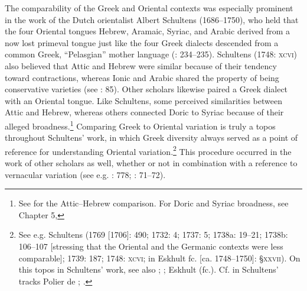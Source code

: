 The comparability of the Greek and Oriental contexts was especially prominent in the work of the Dutch orientalist Albert Schultens (1686–1750), who held that the four Oriental tongues Hebrew, Aramaic, Syriac, and Arabic derived from a now lost primeval tongue just like the four Greek dialects descended from a common Greek, “Pelasgian” mother language (\citealt{Schultens1739}: 234–235). Schultens (1748: \textsc{xcvi)} also believed that Attic and Hebrew were similar because of their tendency toward contractions, whereas Ionic and Arabic shared the property of being conservative varieties (see \citealt{Eskhult2015}: 85). Other scholars likewise paired a Greek dialect with an Oriental tongue. Like Schultens, some perceived similarities between Attic and Hebrew, whereas others connected Doric to Syriac because of their alleged broadness.\footnote{See \citet[425-432]{Lakemacher1730} for the Attic–Hebrew comparison. For Doric and Syriac broadness, see Chapter 5, } Comparing Greek to Oriental variation is truly a topos throughout Schultens’ work, in which Greek diversity always served as a point of reference for understanding Oriental variation.\footnote{See e.g. Schultens (1769 [1706]: 490; 1732: 4; 1737: 5; 1738a: 19–21; 1738b: 106–107 [stressing that the Oriental and the Germanic contexts were less comparable]; 1739: 187; 1748: \textsc{xcvi}; in Eskhult fc. [ca. 1748–1750]: §\textsc{xxvii}). On this topos in Schultens’ work, see also \citet[105]{Fück1955}; \citet[707]{Covington1979}; Eskhult (fc.). Cf. in Schultens’ tracks Polier de \citet[5]{Bottens1739}; \citet{GroddeckTreuge1747}.} This procedure occurred in the work of other scholars as well, whether or not in combination with a reference to vernacular variation (see e.g. \citealt{Bochart1646}: 778; \citealt{Blount1680}: 71–72).

